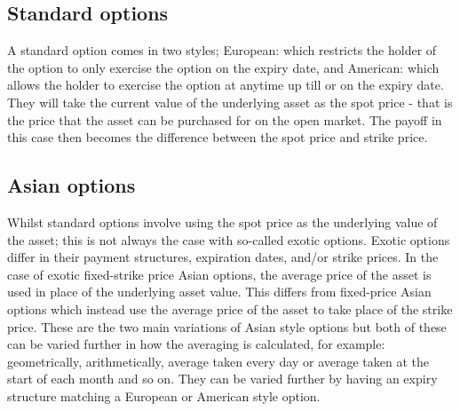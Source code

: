 

\subsection{Standard options}

A standard option comes in two styles; European: which restricts the holder of the option to only exercise the option on the expiry date, and American: which allows the holder to exercise the option at anytime up till or on the expiry date. They will take the current value of the underlying asset as the spot price - that is the price that the asset can be purchased for on the open market. The payoff in this case then becomes the difference between the spot price and strike price.

\subsection{Asian options}

Whilst standard options involve using the spot price as the underlying value of the asset; this is not always the case with so-called exotic options. Exotic options differ in their payment structures, expiration dates, and/or strike prices. In the case of exotic fixed-strike price Asian options, the average price of the asset is used in place of the underlying asset value. This differs from fixed-price Asian options which instead use the average price of the asset to take place of the strike price. These are the two main variations of Asian style options but both of these can be varied further in how the averaging is calculated, for example: geometrically, arithmetically, average taken every day or average taken at the start of each month and so on. They can be varied further by having an expiry structure matching a European or American style option.

